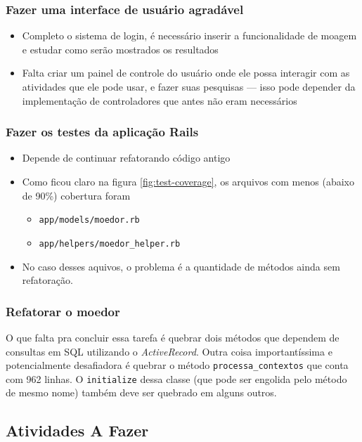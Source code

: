 \subsubsection{Fazer uma interface de usuário agradável}

\begin{itemize}
  \item Completo o sistema de login, é necessário inserir a funcionalidade de moagem e estudar como serão mostrados os
  resultados
  \item Falta criar um painel de controle do usuário onde ele possa interagir com as atividades que ele pode usar, e fazer
  suas pesquisas --- isso pode depender da implementação de controladores que antes não eram necessários
\end{itemize}

\subsubsection{Fazer os testes da aplicação Rails}

\begin{itemize}
  \item Depende de continuar refatorando código antigo
  \item Como ficou claro na figura \ref{fig:test-coverage}, os arquivos com menos (abaixo de 90\%) cobertura foram
  \begin{itemize}
    \item \texttt{app/models/moedor.rb}
    \item \texttt{app/helpers/moedor\_helper.rb}
  \end{itemize}
  \item No caso desses aquivos, o problema é a quantidade de métodos ainda sem refatoração.
\end{itemize}

\subsubsection{Refatorar o moedor}

O que falta pra concluir essa tarefa é quebrar dois métodos que dependem de consultas em SQL utilizando o
\emph{ActiveRecord}. Outra coisa importantíssima e potencialmente desafiadora é quebrar o método
\texttt{processa\_contextos} que conta com 962 linhas. O \texttt{initialize}  dessa classe (que pode ser engolida pelo
método de mesmo nome) também deve ser quebrado em alguns outros.

\subsection{Atividades A Fazer}\label{subsec:to-do}

